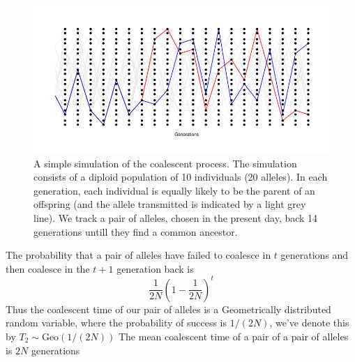 \begin{figure}
\begin{center}
\includegraphics[width=\textwidth]{figures/Coalescent.png}
\end{center}
\caption{A simple simulation of the coalescent process. The simulation
  consists of a diploid population of 10 individuals (20 alleles). In
  each generation, each individual is equally likely to be the parent
  of an offspring (and the allele transmitted is indicated by a light
  grey line).  We track a
  pair of alleles, chosen in the present day, back 14 generations
  untill they find a common ancestor.} \label{fig:Coalescent_simulation}
\end{figure}


The probability that a pair of alleles
have failed to coalesce in $t$ generations and then coalesce in the
$t+1$ generation back is
\begin{equation}
  \frac{1}{2N} \left(1- \frac{1}{2N} \right)^{t} \label{eqn:coal_time_dist}
\end{equation}
Thus the coalescent time of our pair of alleles is a Geometrically distributed random variable,
where the probability of success is $1/(2N)$, we've denote this by $T_2 \sim  \text{Geo}(1/(2N))$
The mean coalescent time of a pair of a pair of alleles is $2N$ generations\\

